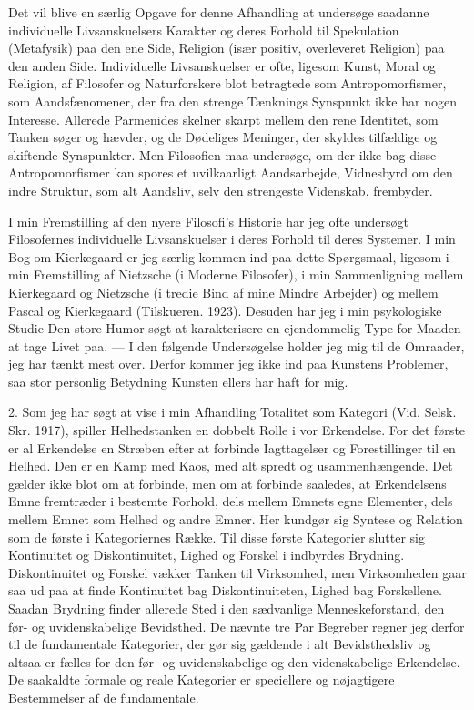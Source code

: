 \documentclass[12pt]{article}
\newcommand{\opage}[1]{\marginnote{\footnotesize\textit{[#1]}}}
\begin{document}
Det vil blive en særlig Opgave for denne Afhandling at undersøge
saadanne individuelle Livsanskuelsers Karakter og deres Forhold til
Spekulation (\guillemotright{}Metafysik\guillemotleft{}) paa den ene Side, Religion (især positiv,
overleveret Religion) paa den anden Side. Individuelle Livsanskuelser
er ofte, ligesom Kunst, Moral og Religion, af Filosofer og
Naturforskere blot betragtede som \guillemotright{}Antropomorfismer\guillemotleft{}, som
Aandsfænomener, der fra den strenge Tænknings Synspunkt ikke har nogen
Interesse. Allerede Parmenides skelner skarpt mellem den rene
Identitet, som Tanken søger og hævder, og \guillemotright{}de Dødeliges Meninger\guillemotleft{}, der
skyldes tilfældige og skiftende Synspunkter. Men Filosofien maa
undersøge, om der ikke bag disse Antropomorfismer kan spores et
uvilkaarligt Aandsarbejde, Vidnesbyrd om den indre Struktur, som alt
Aandsliv, selv den strengeste Videnskab, frembyder.

I min Fremstilling af den nyere Filosofi's Historie har jeg ofte
undersøgt Filosofernes individuelle Livsanskuelser i deres Forhold til
deres Systemer. I min Bog
om Kierkegaard er jeg særlig kommen ind paa dette Spørgsmaal,
ligesom i min Fremstilling af Nietzsche (i \guillemotright{}Moderne Filosofer\guillemotleft{}), i
min Sammenligning mellem Kierkegaard og Nietzsche (i tredie Bind af
mine \guillemotright{}Mindre Arbejder\guillemotleft{}) og mellem Pascal og Kierkegaard (Tilskueren.
1923). Desuden har jeg i min psykologiske Studie \guillemotright{}Den store Humor\guillemotleft{}
søgt at karakterisere en ejendommelig Type for Maaden at tage Livet
paa. --- I den følgende Undersøgelse holder jeg mig til de Omraader,
jeg har tænkt mest over. Derfor kommer jeg ikke ind paa Kunstens
Problemer, saa stor personlig Betydning Kunsten ellers har haft for
mig.

2. Som jeg har søgt at vise i min Afhandling \guillemotright{}Totalitet
\opage{9}som Kategori\guillemotleft{} (Vid. Selsk. Skr. 1917), spiller Helhedstanken en
dobbelt Rolle i vor Erkendelse. For det første er al Erkendelse en
Stræben efter at forbinde Iagttagelser og Forestillinger til en
Helhed. Den er en Kamp med Kaos, med alt spredt og usammenhængende.
Det gælder ikke blot om at forbinde, men om at forbinde saaledes, at
Erkendelsens Emne fremtræder i bestemte Forhold, dels mellem Emnets
egne Elementer, dels mellem Emnet som Helhed og andre Emner. Her
kundgør sig Syntese og Relation som de første i Kategoriernes Række.
Til disse første Kategorier slutter sig Kontinuitet og Diskontinuitet,
Lighed og Forskel i indbyrdes Brydning. Diskontinuitet og Forskel
vækker Tanken til Virksomhed, men Virksomheden gaar saa ud paa at
finde Kontinuitet bag Diskontinuiteten, Lighed bag Forskellene.
Saadan Brydning finder allerede Sted i den sædvanlige
Menneskeforstand, den før- og uvidenskabelige Bevidsthed. De nævnte
tre Par Begreber regner jeg derfor til de fundamentale Kategorier, der
gør sig gældende i alt Bevidsthedsliv og altsaa er fælles for den
før- og uvidenskabelige og den videnskabelige Erkendelse. De saakaldte
formale og reale Kategorier er speciellere og nøjagtigere Bestemmelser
af de fundamentale.
\end{document}
